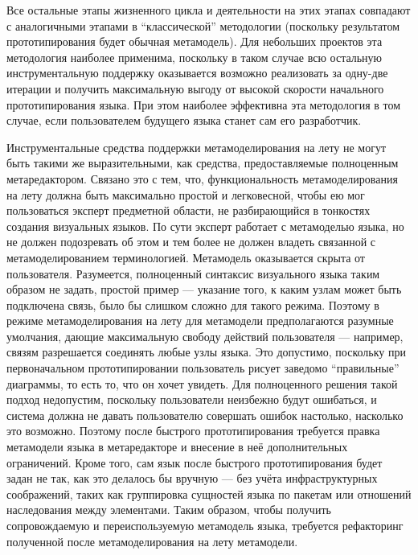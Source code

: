 Все остальные этапы жизненного цикла и деятельности на этих этапах совпадают с аналогичными 
этапами в "`классической"' методологии (поскольку результатом прототипирования будет 
обычная метамодель). Для небольших проектов эта методология наиболее применима, поскольку 
в таком случае всю остальную инструментальную поддержку оказывается возможно реализовать 
за одну-две итерации и получить максимальную выгоду от высокой скорости начального 
прототипирования языка. При этом наиболее эффективна эта методология в том случае, 
если пользователем будущего языка станет сам его разработчик.

Инструментальные средства поддержки метамоделирования на лету не могут быть такими же 
выразительными, как средства, предоставляемые полноценным метаредактором. Связано 
это с тем, что, функциональность метамоделирования на лету должна быть максимально 
простой и легковесной, чтобы ею мог пользоваться эксперт предметной области, не разбирающийся 
в тонкостях создания визуальных языков. По сути эксперт работает с метамоделью языка, 
но не должен подозревать об этом и тем более не должен владеть связанной с метамоделированием 
терминологией. Метамодель оказывается скрыта от пользователя. Разумеется, полноценный 
синтаксис визуального языка таким образом не задать, простой пример --- указание того, 
к каким узлам может быть подключена связь, было бы слишком сложно для такого режима. 
Поэтому в режиме метамоделирования на лету для метамодели предполагаются разумные умолчания, 
дающие максимальную свободу действий пользователя --- например, связям разрешается соединять 
любые узлы языка. Это допустимо, поскольку при первоначальном прототипировании пользователь 
рисует заведомо "`правильные"' диаграммы, то есть то, что он хочет увидеть. Для полноценного 
решения такой подход недопустим, поскольку пользователи неизбежно будут ошибаться, и 
система должна не давать пользователю совершать ошибок настолько, насколько это возможно. 
Поэтому после быстрого прототипирования требуется правка метамодели языка в метаредакторе 
и внесение в неё дополнительных ограничений. Кроме того, сам язык после быстрого прототипирования 
будет задан не так, как это делалось бы вручную --- без учёта инфраструктурных соображений, 
таких как группировка сущностей языка по пакетам или отношений наследования между элементами. 
Таким образом, чтобы получить сопровождаемую и переиспользуемую метамодель языка, требуется 
рефакторинг полученной после метамоделирования на лету метамодели.

